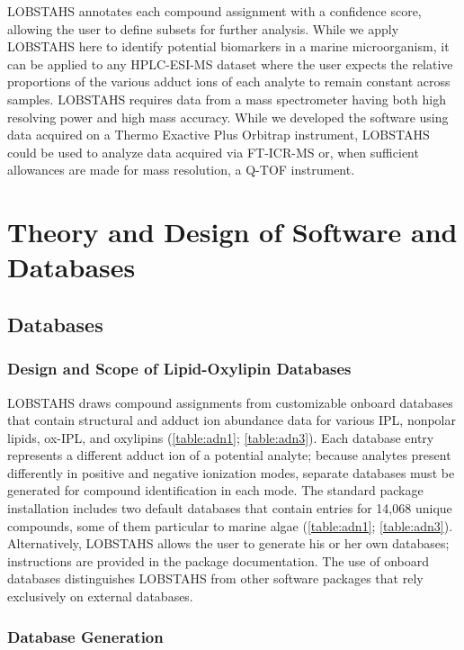 LOBSTAHS annotates each compound assignment with a confidence score, allowing the user to define subsets for further analysis. While we apply LOBSTAHS here to identify potential biomarkers in a marine microorganism, it can be applied to any HPLC-ESI-MS dataset where the user expects the relative proportions of the various adduct ions of each analyte to remain constant across samples. LOBSTAHS requires data from a mass spectrometer having both high resolving power and high mass accuracy. While we developed the software using data acquired on a Thermo Exactive Plus Orbitrap instrument, LOBSTAHS could be used to analyze data acquired via FT-ICR-MS or, when sufficient allowances are made for mass resolution, a Q-TOF instrument.

\section{Theory and Design of Software and Databases}

\subsection{Databases}

\subsubsection{Design and Scope of Lipid-Oxylipin Databases}

LOBSTAHS draws compound assignments from customizable onboard databases that contain structural and adduct ion abundance data for various IPL, nonpolar lipids, ox-IPL, and oxylipins (\autoref{table:adn1}; \autoref{table:adn3}). Each database entry represents a different adduct ion of a potential analyte; because analytes present differently in positive and negative ionization modes, separate databases must be generated for compound identification in each mode. The standard package installation includes two default databases that contain entries for 14,068 unique compounds, some of them particular to marine algae (\autoref{table:adn1}; \autoref{table:adn3}). Alternatively, LOBSTAHS allows the user to generate his or her own databases; instructions are provided in the package documentation. The use of onboard databases distinguishes LOBSTAHS from other software packages that rely exclusively on external databases.

\subsubsection{Database Generation}

